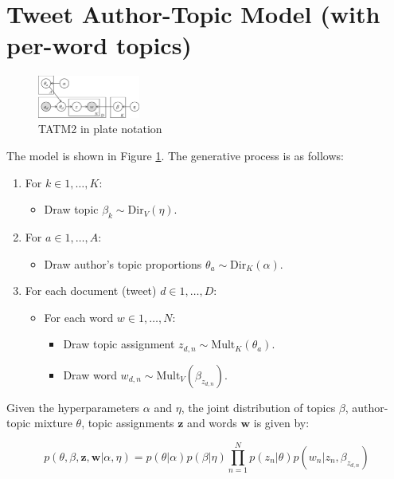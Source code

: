 \section{Tweet Author-Topic Model (with per-word topics)}

\begin{figure}[tb]
    \centering
    \includegraphics[width=0.3\textwidth]{TATM2.eps}
    \caption{TATM2 in plate notation}
    \label{fig:TATM2}
\end{figure}

The model is shown in Figure \ref{fig:TATM2}. The generative process is as follows:

\begin{enumerate}
	\item For $k \in {1, \ldots, K}$:
	\begin{itemize}
		\item Draw topic $\beta_k \sim \text{Dir}_V(\eta)$.
	\end{itemize}
	\item For $a \in {1, \ldots, A}$:
	\begin{itemize}
		\item Draw author's topic proportions $\theta_a \sim \text{Dir}_K(\alpha)$.
	\end{itemize}
  \item For each document (tweet) $d \in {1, \ldots, D}$:
	\begin{itemize}
		\item For each word $w \in {1, \ldots, N}$:
		\begin{itemize}
			\item Draw topic assignment $z_{d,n} \sim \text{Mult}_K(\theta_a)$.
			\item Draw word $w_{d,n} \sim \text{Mult}_V(\beta_{z_{d,n}})$.
		\end{itemize}
	\end{itemize}
\end{enumerate}


Given the hyperparameters $\alpha$ and $\eta$, the joint distribution of topics $\beta$, author-topic mixture $\theta$, topic assignments $\mathbf{z}$ and words $\mathbf{w}$ is given by:

\begin{equation}
p(\theta,\beta,\mathbf{z},\mathbf{w}|\alpha,\eta) = p(\theta|\alpha) p(\beta|\eta) \prod_{n=1}^{N}{p(z_n|\theta)p(w_n|z_n,\beta_{z_{d,n}})}
\end{equation}


